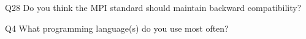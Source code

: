 \begin{description}%
\item{Q28} Do you think the MPI standard should maintain backward compatibility?%
\item{Q4} What programming language(s) do you use most often?%
\end{description}%
